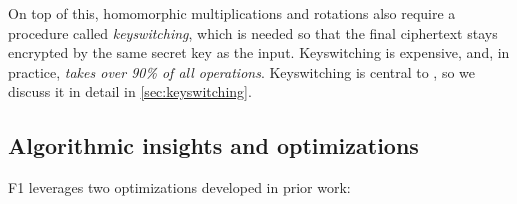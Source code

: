 On top of this, homomorphic multiplications and rotations also require a procedure called \emph{keyswitching},
which is needed so that the final ciphertext
stays encrypted by the same secret key as the input.
Keyswitching is expensive, and, in practice, \emph{takes over 90\% of all operations}.
Keyswitching is central to \name, so we discuss it in detail in \autoref{sec:keyswitching}.




\subsection{Algorithmic insights and optimizations}\label{sec:algoInsights}
\label{sec:fhe_optimizations}

F1 leverages two optimizations developed in prior work:

